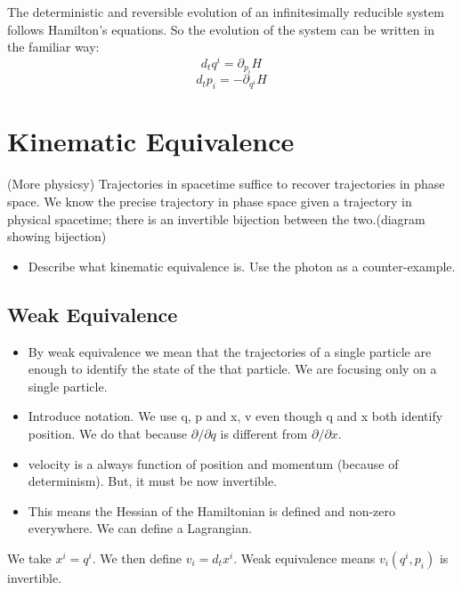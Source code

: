 \documentclass{article}[a4paper]
\begin{document}
\begin{prop}
	The deterministic and reversible evolution of an infinitesimally reducible system follows Hamilton's equations. So the evolution of the system can be written in the familiar way:
	$$d_tq^i = \partial_{p_i}H$$
	$$d_tp_i = -\partial_{q^i}H$$
\end{prop} 

\iffalse
\section{Kinematic Equivalence}

\begin{assump}
	(More physicsy) Trajectories in spacetime suffice to recover trajectories in phase space. We know the precise trajectory in phase space given a trajectory in physical spacetime; there is an invertible bijection between the two.(diagram showing bijection)
\end{assump}

\begin{itemize}
	\item Describe what kinematic equivalence is. Use the photon as a counter-example.
\end{itemize}

\subsection{Weak Equivalence}

\begin{itemize}
	\item By weak equivalence we mean that the trajectories of a single particle are enough to identify the state of the that particle. We are focusing only on a single particle.
	
	\item Introduce notation. We use q, p and x, v even though q and x both identify position. We do that because $\partial/\partial q$ is different from $\partial / \partial x$.
	
	\item velocity is a always function of position and momentum (because of determinism). But, it must be now invertible.
	
	\item This means the Hessian of the Hamiltonian is defined and non-zero everywhere. We can define a Lagrangian.
\end{itemize}

\begin{defn}
	We take $x^i = q^i$. We then define $v_i = d_tx^i$. Weak equivalence means $v_i(q^i, p_i)$ is invertible.
\end{defn}
\end{document}
